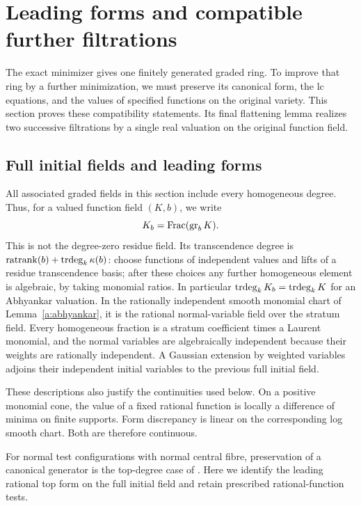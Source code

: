 \section{Leading forms and compatible further filtrations}
\label{a:filtrations}

The exact minimizer gives one finitely generated graded ring. To improve
that ring by a further minimization, we must preserve its canonical form,
the lc equations, and the values of specified functions on the original
variety. This section proves these compatibility statements. Its final
flattening lemma realizes two successive filtrations by a single real
valuation on the original function field.

\subsection{Full initial fields and leading forms}

All associated graded fields in this section include every homogeneous
degree. Thus, for a valued function field \((K,b)\), we write
\[
                         K_b=\operatorname{Frac}(\operatorname{gr}_b K).
\]
This is not the degree-zero residue field. Its transcendence degree is
\(\operatorname{ratrank}(b)+\operatorname{trdeg}_k\kappa(b)\): choose functions of
independent values and lifts of a residue transcendence basis; after
these choices any further homogeneous element is algebraic, by taking
monomial ratios. In particular \(\operatorname{trdeg}_k K_b=\operatorname{trdeg}_k K\) for an
Abhyankar valuation. In the rationally independent smooth monomial chart
of Lemma~\ref{a:abhyankar}, it is the rational normal-variable field over
the stratum field. Every homogeneous fraction is a stratum coefficient
times a Laurent monomial, and the normal variables are algebraically
independent because their weights are rationally independent. A Gaussian
extension by weighted variables adjoins their independent initial
variables to the previous full initial field.

These descriptions also justify the continuities used below. On a
positive monomial cone, the value of a fixed rational function is locally
a difference of minima on finite supports. Form discrepancy is linear
on the corresponding log smooth chart. Both are therefore continuous.

For normal test configurations with normal central fibre, preservation
of a canonical generator is the top-degree case of
\cite[Definition~3.3 and Proposition~3.5(2)]{XuZhuangForms}.
Here we identify the leading rational top form on the full initial field
and retain prescribed rational-function tests.

